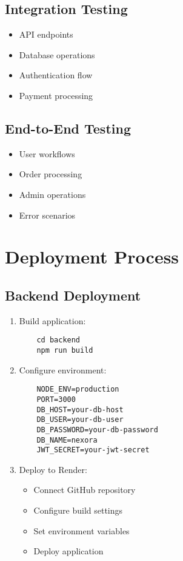 \subsection{Integration Testing}
\begin{itemize}
    \item API endpoints
    \item Database operations
    \item Authentication flow
    \item Payment processing
\end{itemize}

\subsection{End-to-End Testing}
\begin{itemize}
    \item User workflows
    \item Order processing
    \item Admin operations
    \item Error scenarios
\end{itemize}

\section{Deployment Process}
\subsection{Backend Deployment}
\begin{enumerate}
    \item Build application:
    \begin{verbatim}
    cd backend
    npm run build
    \end{verbatim}
    
    \item Configure environment:
    \begin{verbatim}
    NODE_ENV=production
    PORT=3000
    DB_HOST=your-db-host
    DB_USER=your-db-user
    DB_PASSWORD=your-db-password
    DB_NAME=nexora
    JWT_SECRET=your-jwt-secret
    \end{verbatim}
    
    \item Deploy to Render:
    \begin{itemize}
        \item Connect GitHub repository
        \item Configure build settings
        \item Set environment variables
        \item Deploy application
    \end{itemize}
\end{enumerate}

